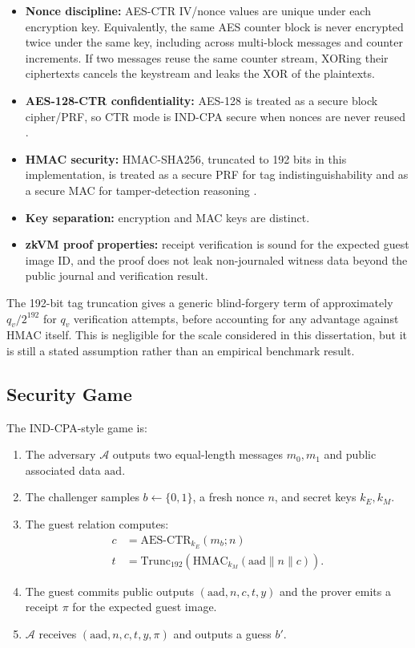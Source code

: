 \begin{itemize}
\item \textbf{Nonce discipline:} AES-CTR IV/nonce values are unique under each
encryption key. Equivalently, the same AES counter block is never encrypted twice
under the same key, including across multi-block messages and counter increments.
If two messages reuse the same counter stream, XORing their ciphertexts cancels
the keystream and leaks the XOR of the plaintexts.
\item \textbf{AES-128-CTR confidentiality:} AES-128 is treated as a secure block
cipher/PRF, so CTR mode is IND-CPA secure when nonces are never reused
\cite{nistfips197,nistsp80038a,katz2020introduction}.
\item \textbf{HMAC security:} HMAC-SHA256, truncated to 192 bits in this
implementation, is treated as a secure PRF for tag indistinguishability and as a
secure MAC for tamper-detection reasoning \cite{rfc2104,nistfips1981}.
\item \textbf{Key separation:} encryption and MAC keys are distinct.
\item \textbf{zkVM proof properties:} receipt verification is sound for the
expected guest image ID, and the proof does not leak non-journaled witness data
beyond the public journal and verification result.
\end{itemize}

The 192-bit tag truncation gives a generic blind-forgery term of approximately
\(q_v / 2^{192}\) for \(q_v\) verification attempts, before accounting for any
advantage against HMAC itself. This is negligible for the scale considered in
this dissertation, but it is still a stated assumption rather than an empirical
benchmark result.

\subsection{Security Game}

The IND-CPA-style game is:

\begin{enumerate}
\item The adversary \(\mathcal{A}\) outputs two equal-length messages
\(m_0, m_1\) and public associated data \(\mathrm{aad}\).
\item The challenger samples \(b \leftarrow \{0,1\}\), a fresh nonce \(n\), and
secret keys \(k_E, k_M\).
\item The guest relation computes:
\begin{align*}
c &= \mathrm{AES\text{-}CTR}_{k_E}(m_b; n) \\
t &= \mathrm{Trunc}_{192}(\mathrm{HMAC}_{k_M}(\mathrm{aad} \parallel n \parallel c)).
\end{align*}
\item The guest commits public outputs \((\mathrm{aad}, n, c, t, y)\) and the
prover emits a receipt \(\pi\) for the expected guest image.
\item \(\mathcal{A}\) receives \((\mathrm{aad}, n, c, t, y, \pi)\) and outputs a
guess \(b'\).
\end{enumerate}

